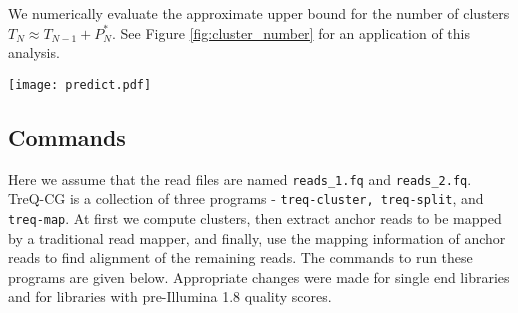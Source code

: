 \documentclass[a4paper]{article}
\begin{document}
We numerically evaluate the approximate upper bound for the number of clusters
$ T_N \approx T_{N-1} + P_N^*$. See Figure \ref{fig:cluster_number} for an application
of this analysis.




\begin{figure*}
\begin{center}
\texttt{[image: predict.pdf]}
\end{center}
\caption{
{\bf Expected number of clusters.}
From an artificially generated sample genome,
an i.i.d. sequence of 1 million bases,
we sequence 100bp single-end reads with coverage 25, 50, and 100, and insert
sequencing error at a rate ranging from 0.005 to 0.09. 
We compare the true number of clusters computed using the clustering algorithm
to the numerically evaluated ones
for $\beta=0.95$ and $\beta=0.9$.
The total number of cluster is computed very
accurately except for small values of $\epsilon$. 
It is evident that $ \beta \le (1-2\epsilon)$ 
keeps the total number of clusters small.}
\label{fig:cluster_number}
\end{figure*}



\subsection*{Commands}

Here we assume that the read files are named {\tt reads\_1.fq} and {\tt reads\_2.fq}.
TreQ-CG is a collection of three programs - {\tt treq-cluster, treq-split}, and {\tt treq-map}. 
At first we compute clusters, then extract anchor reads to be mapped by a traditional
read mapper, and finally, use the mapping information of anchor reads to find alignment of the
remaining reads.
The commands to run these programs are given below. 
Appropriate changes were made for single end libraries and for libraries with pre-Illumina 1.8 quality scores.
\end{document}
